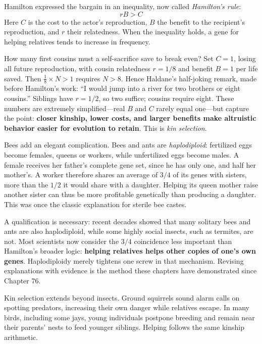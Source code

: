 \begin{qiaoliang}
Hamilton expressed the bargain in an inequality, now called \emph{Hamilton's rule}:
\[
rB > C
\]
Here $C$ is the cost to the actor's reproduction, $B$ the benefit to the recipient's reproduction, and $r$ their relatedness. When the inequality holds, a gene for helping relatives tends to increase in frequency.

How many first cousins must a self-sacrifice save to break even? Set $C=1$, losing all future reproduction, with cousin relatedness $r=1/8$ and benefit $B=1$ per life saved. Then $\frac{1}{8} \times N > 1$ requires $N>8$. Hence Haldane's half-joking remark, made before Hamilton's work: ``I would jump into a river for two brothers or eight cousins.'' Siblings have $r=1/2$, so two suffice; cousins require eight. These numbers are extremely simplified---real $B$ and $C$ rarely equal one---but capture the point: \textbf{closer kinship, lower costs, and larger benefits make altruistic behavior easier for evolution to retain}. This is \emph{kin selection}.
\end{qiaoliang}

Bees add an elegant complication. Bees and ants are \emph{haplodiploid}: fertilized eggs become females, queens or workers, while unfertilized eggs become males. A female receives her father's complete gene set, since he has only one, and half her mother's. A worker therefore shares an average of $3/4$ of its genes with sisters, more than the $1/2$ it would share with a daughter. Helping its queen mother raise another sister can thus be more profitable genetically than producing a daughter. This was once the classic explanation for sterile bee castes.

A qualification is necessary: recent decades showed that many solitary bees and ants are also haplodiploid, while some highly social insects, such as termites, are not. Most scientists now consider the $3/4$ coincidence less important than Hamilton's broader logic: \textbf{helping relatives helps other copies of one's own genes}. Haplodiploidy merely tightens one screw in that mechanism. Revising explanations with evidence is the method these chapters have demonstrated since Chapter 76.

Kin selection extends beyond insects. Ground squirrels sound alarm calls on spotting predators, increasing their own danger while relatives escape. In many birds, including some jays, young individuals postpone breeding and remain near their parents' nests to feed younger siblings. Helping follows the same kinship arithmetic.

